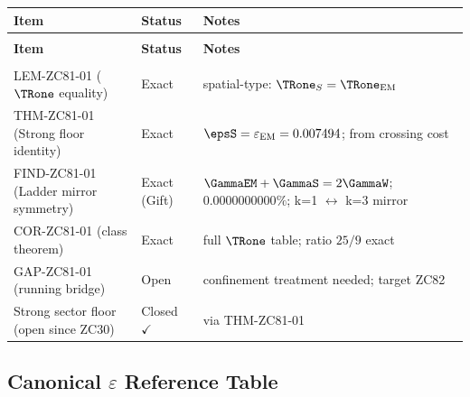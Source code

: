 \documentclass[12pt, a4paper]{article}
\renewcommand{\epsEM}{\varepsilon_{\rm EM}}
\begin{document}
{\small
\setlength{\LTpre}{4pt}\setlength{\LTpost}{4pt}
\renewcommand{\arraystretch}{1.30}
\begin{longtable}{>{\raggedright\arraybackslash}p{5.0cm}
                  >{\centering\arraybackslash}p{2.4cm}
                  >{\raggedright\arraybackslash}p{5.2cm}}
\toprule
\textbf{Item} & \textbf{Status} & \textbf{Notes} \\
\midrule
\endfirsthead
\multicolumn{3}{l}{\small\textit{(continued)}}\\[4pt]
\toprule\textbf{Item}&\textbf{Status}&\textbf{Notes}\\\midrule
\endhead
\midrule\multicolumn{3}{r}{\small\textit{(continues)}}\\
\endfoot
\bottomrule
\endlastfoot
LEM-ZC81-01 ($\TRone$ equality)
  & Exact & spatial-type: $\TRone_S = \TRone_{\rm EM}$ \\[4pt]
THM-ZC81-01 (Strong floor identity)
  & Exact & $\epsS = \epsEM = 0.007494$; from crossing cost \\[4pt]
FIND-ZC81-01 (Ladder mirror symmetry)
  & Exact (Gift) & $\GammaEM+\GammaS=2\GammaW$;
    $0.0000000000\%$; k=1 $\leftrightarrow$ k=3 mirror \\[4pt]
COR-ZC81-01 (class theorem)
  & Exact & full $\TRone$ table; ratio $25/9$ exact \\[4pt]
GAP-ZC81-01 (running bridge)
  & Open & confinement treatment needed; target ZC82 \\[4pt]
\midrule
Strong sector floor (open since ZC30)
  & Closed $\checkmark$ & via THM-ZC81-01 \\
\bottomrule
\end{longtable}
}

\subsection{Canonical $\varepsilon$ Reference Table}
\label{sec:eps-table}
\end{document}

